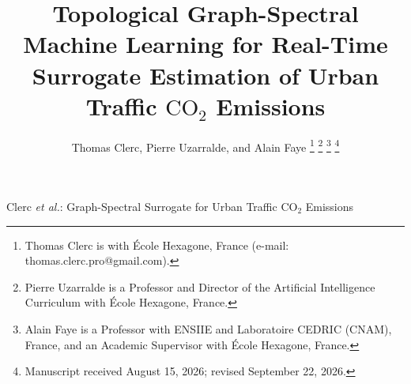 \documentclass[journal]{IEEEtran}
\begin{document}
\title{Topological Graph-Spectral Machine Learning for Real-Time Surrogate Estimation of Urban Traffic $\text{CO}_2$ Emissions}

\author{Thomas Clerc, Pierre Uzarralde, and Alain Faye%
\thanks{Thomas Clerc is with \'Ecole Hexagone, France (e-mail: thomas.clerc.pro@gmail.com).}%
\thanks{Pierre Uzarralde is a Professor and Director of the Artificial Intelligence Curriculum with \'Ecole Hexagone, France.}%
\thanks{Alain Faye is a Professor with ENSIIE and Laboratoire CEDRIC (CNAM), France, and an Academic Supervisor with \'Ecole Hexagone, France.}%
\thanks{Manuscript received August 15, 2026; revised September 22, 2026.}}

%
{Clerc \MakeLowercase{\textit{et al.}}: Graph-Spectral Surrogate for Urban Traffic $\text{CO}_2$ Emissions}

\maketitle
\end{document}

